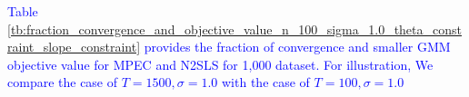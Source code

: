 \documentclass[11pt, a4paper]{article}
\begin{document}
\textcolor{blue}{Table \ref{tb:fraction_convergence_and_objective_value_n_100_sigma_1.0_theta_constraint_slope_constraint} provides the fraction of convergence and smaller GMM objective value for MPEC and N2SLS for 1,000 dataset. For illustration, We compare the case of $T=1500, \sigma=1.0$ with the case of $T=100, \sigma=1.0$}


\end{document}
